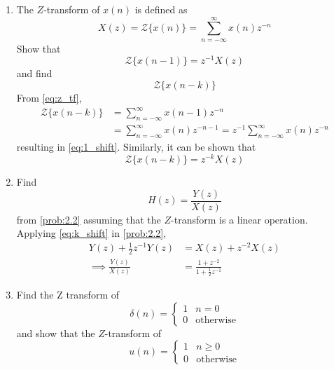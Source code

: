 \documentclass[journal,12pt,twocolumn]{IEEEtran}
\theoremstyle{remark}
\begin{document}
\begin{enumerate}[label=\thesection.\arabic*]
\item The $Z$-transform of $x(n)$ is defined as
%
\begin{equation}
X(z)={\mathcal {Z}}\{x(n)\}=\sum _{n=-\infty }^{\infty }x(n)z^{-n} \label{eq:z_tf}
\end{equation}
%
Show that
\begin{equation}
{\mathcal {Z}}\{x(n-1)\} = z^{-1}X(z)\label{eq:1_shift}
\end{equation}
and find
\begin{equation}
	{\mathcal {Z}}\{x(n-k)\} 
\end{equation}
\solution From \eqref{eq:z_tf},
\begin{align}
{\mathcal {Z}}\{x(n-k)\} &=\sum _{n=-\infty }^{\infty }x(n-1)z^{-n}
\\
&=\sum _{n=-\infty }^{\infty }x(n)z^{-n-1} = z^{-1}\sum _{n=-\infty }^{\infty }x(n)z^{-n}
\end{align}
resulting in \eqref{eq:1_shift}. Similarly, it can be shown that
%
\begin{equation}
	{\mathcal {Z}}\{x(n-k)\} = z^{-k}X(z) \label{eq:k_shift}
\end{equation}
\item Find
%
\begin{equation}
H(z) = \frac{Y(z)}{X(z)}
\end{equation}
from  \eqref{prob:2.2} assuming that the $Z$-transform is a linear operation.
\\
\solution  Applying \eqref{eq:k_shift} in \eqref{prob:2.2},
\begin{align}
Y(z) + \frac{1}{2}z^{-1}Y(z) &= X(z)+z^{-2}X(z)
\\
\implies \frac{Y(z)}{X(z)} &= \frac{1 + z^{-2}}{1 + \frac{1}{2}z^{-1}}
\label{eq:transfer_fn}
\end{align}
%
\item Find the Z transform of 
\begin{equation}
\delta(n)
=
\begin{cases}
1 & n = 0
\\
0 & \text{otherwise}
\end{cases}
\end{equation}
and show that the $Z$-transform of
\begin{equation}
\label{eq:unit_step}
u(n)
=
\begin{cases}
1 & n \ge 0
\\
0 & \text{otherwise}
\end{cases}

\end{equation}
\end{enumerate}
\end{document}
